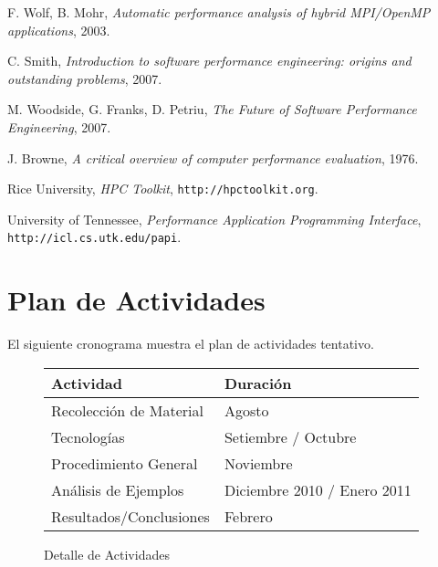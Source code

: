 \documentclass[a4paper]{article}
\begin{document}
\begin{thebibliography}{9}
 F. Wolf, B. Mohr,
 \emph{Automatic performance analysis of hybrid MPI/OpenMP applications},
 2003.

 C. Smith,
 \emph{Introduction to software performance engineering: origins and outstanding problems},
 2007.

 M. Woodside, G. Franks, D. Petriu,
 \emph{The Future of Software Performance Engineering},
 2007.

 J. Browne,
 \emph{A critical overview of computer performance evaluation},
 1976.

  Rice University,
 \emph{HPC Toolkit},
 {\tt http://hpctoolkit.org}.

  University of Tennessee,
  \emph{Performance Application Programming Interface},
  {\tt http://icl.cs.utk.edu/papi}.


\end{thebibliography}

\section{Plan de Actividades}

El siguiente cronograma muestra el plan de actividades tentativo.

\begin{figure}[H]
  \begin{center}
    \begin{tabular}{|l|l|}\hline
      {\bf Actividad} & {\bf Duraci\'on} \\ \hline
      Recolecci\'on de Material & Agosto \\ \hline
      Tecnolog\'ias & Setiembre / Octubre \\ \hline
      Procedimiento General & Noviembre \\ \hline
      An\'alisis de Ejemplos & Diciembre 2010 / Enero 2011 \\ \hline
      Resultados/Conclusiones & Febrero \\ \hline
    \end{tabular}
    \caption{Detalle de Actividades}
  \end{center}
  \label{schedule}
\end{figure}

\appendix
\end{document}
